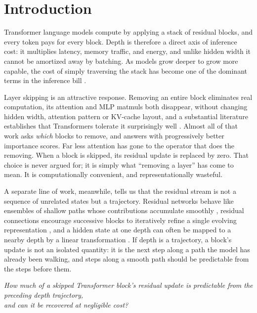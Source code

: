 \section{Introduction}
\label{sec:introduction}

Transformer language models compute by applying a stack of residual blocks, and
every token pays for every block. Depth is therefore a direct axis of inference
cost: it multiplies latency, memory traffic, and energy, and unlike hidden width
it cannot be amortized away by batching. As models grow deeper to grow more
capable, the cost of simply traversing the stack has become one of the dominant
terms in the inference bill \citep{zhen2025taming}.

Layer skipping is an attractive response. Removing an entire block eliminates real
computation, its attention and MLP matmuls both disappear, without changing hidden
width, attention pattern or KV-cache layout, and a substantial literature establishes that
Transformers tolerate it surprisingly well \citep{men2024shortgpt, gromov2024unreasonable,
fan2020reducing}. Almost all of that work asks \emph{which} blocks to remove, and answers
with progressively better importance scores. Far less attention has gone to the operator
that does the removing. When a block is skipped, its residual update is replaced by zero.
That choice is never argued for; it is simply what ``removing a layer'' has come to mean.
It is computationally convenient, and representationally wasteful.

A separate line of work, meanwhile, tells us that the residual stream is not a
sequence of unrelated states but a trajectory. Residual networks behave like
ensembles of shallow paths whose contributions accumulate smoothly
\citep{veit2016residual}, residual connections encourage successive blocks to
iteratively refine a single evolving representation
\citep{jastrzebski2018residual}, and a hidden state at one depth can often be
mapped to a nearby depth by a linear transformation \citep{din2023jump,
belrose2023eliciting}. If depth is a trajectory, a block's update is not an
isolated quantity: it is the next step along a path the model has already been
walking, and steps along a smooth path should be predictable from the steps
before them.

\begin{center}
\emph{How much of a skipped Transformer block's residual update is predictable from the preceding depth trajectory, \\ and can it be recovered at negligible
cost?}
\end{center}

